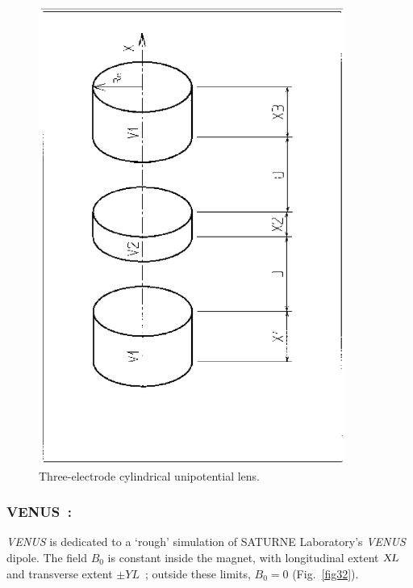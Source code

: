 \begin{figure}[H]
\centerline{\includegraphics[height=15cm,angle=-90]{Fig31.ps}}
\caption{\label{fig31}Three-electrode cylindrical unipotential lens.}
\end{figure}
\vfill

\newpage

\subsubsection*{VENUS~: \VENUSTitl}  \label{VENUS}
\medskip 
{} 

\textsl{VENUS} is dedicated to a `rough' simulation
of SATURNE Laboratory's  \textsl{VENUS} 
dipole.  The field $ B_0 $ is constant inside the magnet, with longitudinal 
extent $ \textsl{XL} $ and transverse extent $ \pm YL $~;  outside these limits, $ B_0=0$ 
(Fig.~\ref{fig32}).  

